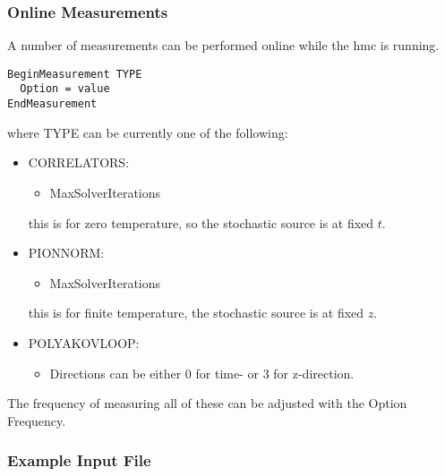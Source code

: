 \subsubsection{Online Measurements}

A number of measurements can be performed online while the hmc is
running. 
\begin{verbatim}
BeginMeasurement TYPE
  Option = value
EndMeasurement
\end{verbatim}
where {\ttfamily TYPE} can be currently one of the following:
\begin{itemize}
\item {\ttfamily CORRELATORS}:
  \begin{itemize}
  \item {\ttfamily MaxSolverIterations}
  \end{itemize}
  this is for zero temperature, so the stochastic source is at fixed $t$.
\item {\ttfamily PIONNORM}:
  \begin{itemize}
  \item {\ttfamily MaxSolverIterations}
  \end{itemize}
  this is for finite temperature, the stochastic source is at fixed $z$.

\item {\ttfamily POLYAKOVLOOP}:
  \begin{itemize}
  \item {\ttfamily Directions} can be either $0$ for time- or $3$ for z-direction.
  \end{itemize}
\end{itemize}
The frequency of measuring all of these can be adjusted with the
Option {\ttfamily Frequency}. 

\subsubsection{Example Input File}

